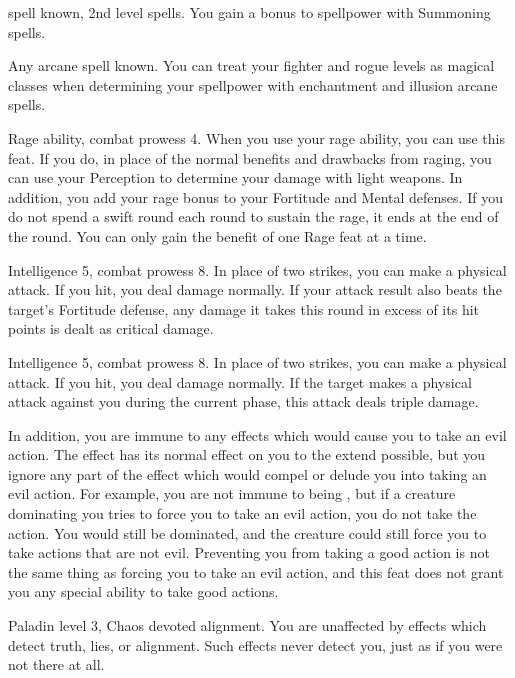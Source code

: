 \featpres {} spell known, 2nd level spells.
\featben You gain a  bonus to spellpower with Summoning spells.


\featpre Any arcane spell known.
\featben You can treat your fighter and rogue levels as magical classes when determining your spellpower with enchantment and illusion arcane spells.


\featpres Rage ability, combat prowess 4.
\featben When you use your rage ability, you can use this feat. If you do, in place of the normal benefits and drawbacks from raging, you can use your Perception to determine your damage with light weapons.
In addition, you add your rage bonus to your Fortitude and Mental defenses.
If you do not spend a swift round each round to sustain the rage, it ends at the end of the round.
 You can only gain the benefit of one Rage feat at a time.


\featpres Intelligence 5, combat prowess 8.
\featben In place of two strikes, you can make a physical attack.
If you hit, you deal damage normally.
If your attack result also beats the target's Fortitude defense, any damage it takes this round in excess of its hit points is dealt as critical damage.

\featpres Intelligence 5, combat prowess 8.
\featben In place of two strikes, you can make a physical attack.
If you hit, you deal damage normally.
If the target makes a physical attack against you during the current phase, this attack deals triple damage.


In addition, you are immune to any  effects which would cause you to take an evil action.
The effect has its normal effect on you to the extend possible, but you ignore any part of the effect which would compel or delude you into taking an evil action.
For example, you are not immune to being , but if a creature dominating you tries to force you to take an evil action, you do not take the action.
You would still be dominated, and the creature could still force you to take actions that are not evil.
Preventing you from taking a good action is not the same thing as forcing you to take an evil action, and this feat does not grant you any special ability to take good actions.


\featpres Paladin level 3, Chaos devoted alignment.
\featben You are unaffected by effects which detect truth, lies, or alignment.
Such effects never detect you, just as if you were not there at all.

